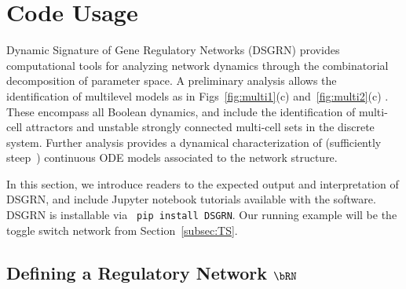 \section{Code Usage}
\label{sec:code}


Dynamic Signature of Gene Regulatory Networks (DSGRN) provides computational tools for analyzing network dynamics through the combinatorial decomposition of parameter space. A preliminary analysis allows the identification of multilevel models as in Figs~\ref{fig:multi1}(c) and~\ref{fig:multi2}(c) \cite{Cummins2017b}. These encompass all Boolean dynamics, and include the identification of multi-cell attractors and unstable strongly connected multi-cell sets in the discrete system. Further analysis provides a dynamical characterization of (sufficiently steep~\cite{rook_field:24}) continuous ODE models associated to the network structure.

In this section, we introduce readers to the expected output and interpretation of DSGRN, and include Jupyter notebook tutorials available with the software. DSGRN is installable via \texttt{
pip install DSGRN}. Our running example will be the toggle switch network from Section~\ref{subsec:TS}.

\subsection{Defining a Regulatory Network $\bRN$}


